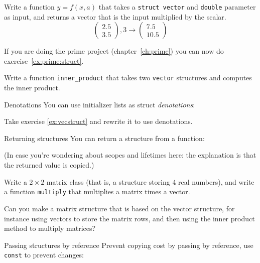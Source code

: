 \begin{exercise}
  \label{ex:vecstruct-scale}
  Write a function $y=f(x,a)$ that takes a \lstinline$struct vector$ and
  \lstinline$double$ parameter as input, and returns a vector that is the
  input multiplied by the scalar.
  \[ \begin{pmatrix}2.5\\3.5\end{pmatrix},3 \rightarrow
    \begin{pmatrix}7.5\\10.5\end{pmatrix} \]
\end{exercise}

\begin{exercise}
  \label{ex:primestruct}
  If you are doing the prime project (chapter~\ref{ch:prime}) you can
  now do exercise~\ref{ex:prime:struct}.
\end{exercise}

\begin{exercise}
  \label{ex:vecstruct}
  Write a function \lstinline$inner_product$ that takes two \lstinline$vector$
  structures and computes the inner product.
\end{exercise}

\begin{block}{Denotations}
  \label{sl:struct-denote}
  You can use initializer lists as struct
  \emph{denotations}:
\end{block}

\begin{exercise}
  \label{ex:struct-denote}
  Take exercise \ref{ex:vecstruct} and rewrite it to use denotations.
\end{exercise}

\begin{block}{Returning structures}
  \label{sl:struct-return}
  You can return a structure from a function:

  (In case you're wondering about scopes and lifetimes here: the
  explanation is that the returned value is copied.)
\end{block}

\begin{exercise}
  \label{ex:matstruct}
  Write a $2\times 2$ matrix class (that is, a structure storing 4
  real numbers), and write a function \lstinline$multiply$
  that multiplies a matrix times a vector.

  Can you make a matrix structure that is based on the vector
  structure, for instance using vectors to store the matrix rows, and
  then using the inner product method to multiply matrices?
\end{exercise}

\begin{block}{Passing structures by reference}
  \label{sl:struct-passref}
  Prevent copying cost by passing by reference, use \lstinline$const$ to
  prevent changes:
\end{block}




